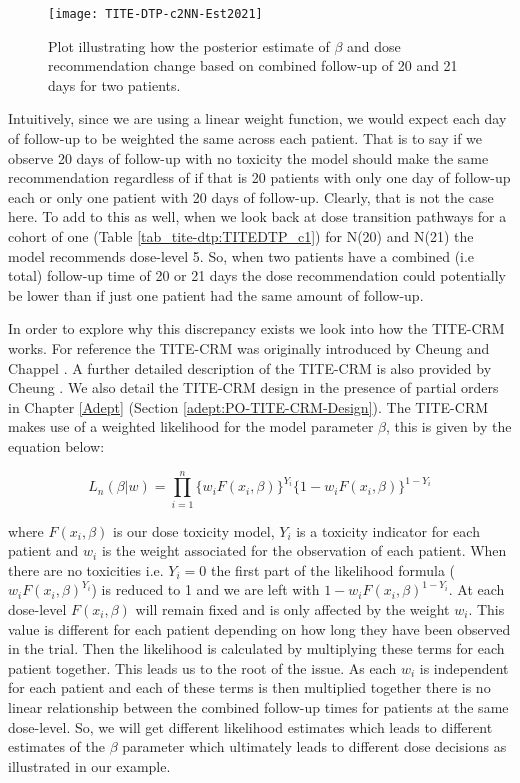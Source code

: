 \begin{figure}[h!]
	\centering
	\caption[Changes in $\beta$ based on combined follow-up of 20 and 21 days for two patients.]{Plot illustrating how the posterior estimate of $\beta$ and dose recommendation change based on combined follow-up of 20 and 21 days for two patients.}
	\label{fig_tite-dtp:c2NNEst2021}
	\texttt{[image: TITE-DTP-c2NN-Est2021]}
\end{figure}

Intuitively, since we are using a linear weight function, we would expect each day of follow-up to be weighted the same across each patient. That is to say if we observe 20 days of follow-up with no toxicity the model should make the same recommendation regardless of if that is 20 patients with only one day of follow-up each or only one patient with 20 days of follow-up. Clearly, that is not the case here. To add to this as well, when we look back at dose transition pathways for a cohort of one (Table \ref{tab_tite-dtp:TITEDTP_c1}) for N(20) and N(21) the model recommends dose-level 5. So, when two patients have a combined (i.e total) follow-up time of 20 or 21 days the dose recommendation could potentially be lower than if just one patient had the same amount of follow-up.   

In order to explore why this discrepancy exists we look into how the TITE-CRM works. For reference the TITE-CRM was originally introduced by Cheung and Chappel \cite{cheungSequentialDesignsPhase2000}. A further detailed description of the TITE-CRM is also provided by Cheung \cite{cheungDoseFindingContinual2011}. We also detail the TITE-CRM design in the presence of partial orders in Chapter \ref{Adept} (Section \ref{adept:PO-TITE-CRM-Design}). The TITE-CRM makes use of a weighted likelihood for the model parameter $\beta$, this is given by the equation below: 

\begin{equation}
	\label{eq_tite-dtp:titelikelihood}
	{L}_n(\beta|w)=\prod_{i=1}^{n}\{w_i F(x_i,\beta)\}^{Y_i} \{1-w_i F(x_i,\beta)\}^{1-Y_i}
\end{equation}

where $F(x_i, \beta)$ is our dose toxicity model, $Y_i$ is a toxicity indicator for each patient and $w_i$ is the weight associated for the observation of each patient. When there are no toxicities i.e. $Y_i = 0$ the first part of the likelihood formula ($w_iF(x_i,\beta)^{Y_i}$) is reduced to 1 and we are left with $1- w_iF(x_i,\beta)^{1-Y_i}$. At each dose-level $F(x_i, \beta)$ will remain fixed and is only affected by the weight $w_i$. This value is different for each patient depending on how long they have been observed in the trial. Then the likelihood is calculated by multiplying these terms for each patient together. This leads us to the root of the issue. As each $w_i$ is independent for each patient and each of these terms is then multiplied together there is no linear relationship between the combined follow-up times for patients at the same dose-level. So, we will get different likelihood estimates which leads to different estimates of the $\beta$ parameter which ultimately leads to different dose decisions as illustrated in our example. 

